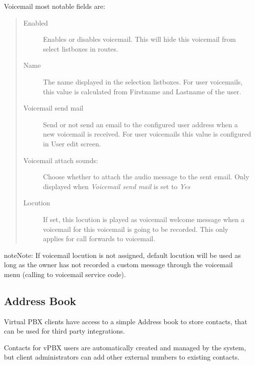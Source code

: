 \documentclass[letterpaper,10pt,english]{sphinxmanual}
\begin{document}
Voicemail most notable fields are:
\begin{quote}
\begin{description}
\item[{Enabled}] \leavevmode
Enables or disables voicemail. This will hide this voicemail from select listboxes in routes.

\item[{Name}] \leavevmode
The name displayed in the selection listboxes. For user voicemails, this value is calculated from Firstname and
Lastname of the user.

\item[{Voicemail send mail}] \leavevmode
Send or not send an email to the configured user address when a new voicemail is received. For user voicemails this value
is configured in User edit screen.

\item[{Voicemail attach sounds:}] \leavevmode
Choose whether to attach the audio message to the sent email. Only displayed when \emph{Voicemail send mail} is set to \emph{Yes}

\item[{Locution}] \leavevmode
If set, this locution is played as voicemail welcome message when a voicemail
for this voicemail is going to be recorded. This only applies for call forwards
to voicemail.

\end{description}
\end{quote}

\begin{notice}{note}{Note:}
If voicemail locution is not assigned, default locution will be used as long as
the owner has not recorded a custom message through the voicemail menu (calling to
voicemail service code).
\end{notice}


\subsection{Address Book}
\label{administration_portal/client/vpbx/addressbook:address-book}\label{administration_portal/client/vpbx/addressbook::doc}
Virtual PBX clients have access to a simple Address book to store contacts,
that can be used for third party integrations.

Contacts for vPBX users are automatically created and managed by the system,
but client administrators can add other external numbers to existing contacts.
\end{document}
